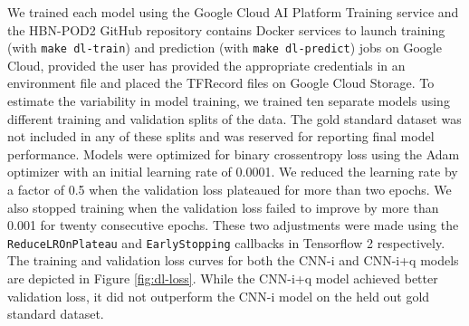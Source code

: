\documentclass[fleqn,10pt]{wlscirep}
\begin{document}
We trained each model using the Google Cloud AI Platform Training service and
the HBN-POD2 GitHub repository contains Docker services to launch training (with
\texttt{make dl-train}) and prediction (with \texttt{make dl-predict}) jobs on
Google Cloud, provided the user has provided the appropriate credentials in an
environment file and placed the TFRecord files on Google Cloud Storage. To
estimate the variability in model training, we trained ten separate models using
different training and validation splits of the data. The gold standard dataset
was not included in any of these splits and was reserved for reporting final
model performance. Models were optimized for binary crossentropy loss using the
Adam optimizer \cite{kingma2017adam} with an initial learning rate of 0.0001. We
reduced the learning rate by a factor of 0.5 when the validation loss plateaued
for more than two epochs. We also stopped training when the validation loss
failed to improve by more than 0.001 for twenty consecutive epochs. These two
adjustments were made using the \texttt{ReduceLROnPlateau} and
\texttt{EarlyStopping} callbacks in Tensorflow 2 \cite{tensorflow} respectively.
The training and validation loss curves for both the CNN-i and CNN-i+q models
are depicted in Figure \ref{fig:dl-loss}. While the CNN-i+q model achieved
better validation loss, it did not outperform the CNN-i model on the held out
gold standard dataset.
\end{document}
